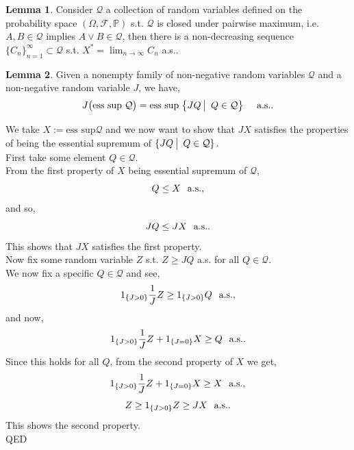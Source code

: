 \documentclass[12pt]{article}
\newcommand{\cF}{\mathcal{F}}
\newcommand{\Prb}{\mathbb{P}}
\newcommand{\quantifyspace}{\hspace{2px} \big | \hspace{5px}}
\newcommand{\PS}{(\Omega, \cF, \Prb)}
\newcommand{\spc}{\hspace{7 px}}
\newcommand{\sspc}{\hspace{3 px}}
\newcommand{\ind}[1]{1_{\{#1\}}}
\newcommand{\als}{\text{a.s.}}
\newcommand{\esssup}{\text{ess sup}}
\newcommand{\QED}{\hspace*{\fill}\textup{QED}}
\theoremstyle{definition}
\newtheorem{lemma}{Lemma}
\begin{document}
\begin{lemma} \cite{karatzas1998}
    Consider $\mathcal{Q}$ a collection of random variables defined on the probability space $\PS$ s.t. $\mathcal{Q}$ is closed under pairwise maximum, i.e.
    $A,B \in \mathcal{Q}$ implies $A \vee B \in \mathcal{Q}$, then there is a non-decreasing sequence $\{C_n\}_{n=1}^\infty \subset \mathcal{Q}$ s.t. $X^* = \lim_{n \to \infty} C_n$ a.s..
\end{lemma}

\begin{lemma}
    Given a nonempty family of non-negative random variables $\mathcal{Q}$ and a non-negative random variable $J$, we have,
    \[
        J \big ( \esssup \sspc \mathcal{Q} \big ) = \esssup \sspc \big \{J Q \quantifyspace Q \in \mathcal{Q} \big \} \spc \spc \als.
    \]
    \proof
    
    We take $X := \esssup \mathcal{Q}$ and we now want to show that $J X$ satisfies the properties of being the essential supremum of $\{JQ \quantifyspace Q \in \mathcal{Q}\}$. \\
    First take some element $Q \in \mathcal{Q}$. \\
    From the first property of $X$ being essential supremum of $\mathcal{Q}$,
    \[
        Q \leq X \spc \als,
    \]
    and so,
    \[
        JQ \leq J X \spc \als.
    \]
    This shows that $JX$ satisfies the first property. \\
    Now fix some random variable $Z$ s.t. $Z \geq JQ$ a.s. for all $Q \in \mathcal{Q}$. \\
    We now fix a specific $Q \in \mathcal{Q}$ and see,
    \[
        \ind{J > 0} \frac{1}{J}Z \geq \ind{J > 0} Q \spc \als,
    \]
    and now,
    \[
        \ind{J > 0} \frac{1}{J} Z + \ind{J = 0} X \geq Q \spc \als.
    \]
    Since this holds for all $Q$, from the second property of $X$ we get,
    \[
        \ind{J > 0} \frac{1}{J} Z + \ind{J = 0} X \geq X \spc \als,
    \]
    \[
        Z \geq \ind{J > 0} Z \geq J X \spc \als.
    \]
    This shows the second property. \\
    \QED
\end{lemma}
\end{document}
